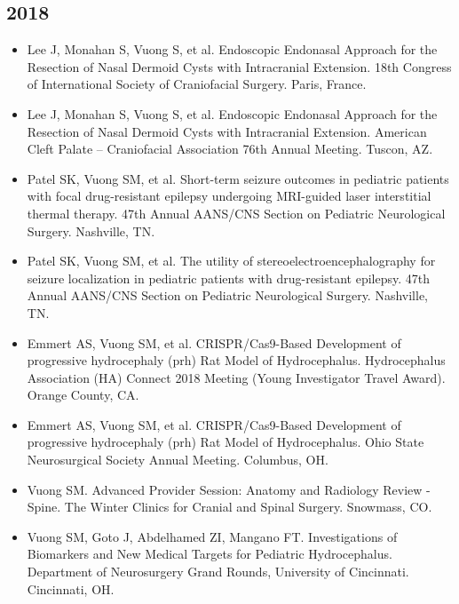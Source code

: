 \documentclass[11pt, a4paper]{article}
\begin{document}
\subsection{2018}
\begin{itemize}
  \setlength\itemindent{0.25em}
  \item Lee J, Monahan S, Vuong S, et al. Endoscopic Endonasal Approach for the Resection of Nasal Dermoid Cysts with Intracranial Extension. 18th Congress of International Society of Craniofacial Surgery. Paris, France.
  \item Lee J, Monahan S, Vuong S, et al. Endoscopic Endonasal Approach for the Resection of Nasal Dermoid Cysts with Intracranial Extension. American Cleft Palate -- Craniofacial Association 76th Annual Meeting. Tuscon, AZ.
  \item Patel SK, Vuong SM, et al. Short-term seizure outcomes in pediatric patients with focal drug-resistant epilepsy undergoing MRI-guided laser interstitial thermal therapy. 47th Annual AANS/CNS Section on Pediatric Neurological Surgery. Nashville, TN.
  \item Patel SK, Vuong SM, et al. The utility of stereoelectroencephalography for seizure localization in pediatric patients with drug-resistant epilepsy. 47th Annual AANS/CNS Section on Pediatric Neurological Surgery. Nashville, TN.
  \item Emmert AS, Vuong SM, et al. CRISPR/Cas9-Based Development of progressive hydrocephaly (prh) Rat Model of Hydrocephalus. Hydrocephalus Association (HA) Connect 2018 Meeting (Young Investigator Travel Award). Orange County, CA.
  \item Emmert AS, Vuong SM, et al. CRISPR/Cas9-Based Development of progressive hydrocephaly (prh) Rat Model of Hydrocephalus. Ohio State Neurosurgical Society Annual Meeting. Columbus, OH.
  \item Vuong SM. Advanced Provider Session: Anatomy and Radiology Review - Spine. The Winter Clinics for Cranial and Spinal Surgery. Snowmass, CO.
  \item Vuong SM, Goto J, Abdelhamed ZI, Mangano FT. Investigations of Biomarkers and New Medical Targets for Pediatric Hydrocephalus. Department of Neurosurgery Grand Rounds, University of Cincinnati. Cincinnati, OH.
\end{itemize}
\end{document}
